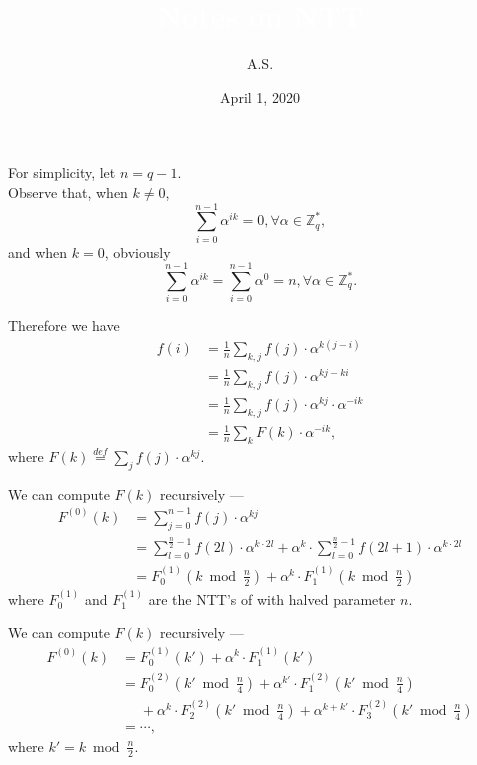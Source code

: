 \documentclass{beamer}	%
\title{\textcolor{white}{Notes on NTT}}
\subtitle{\textcolor{white}{}}
\author{A.S.}
\date{April 1, 2020}
\newcommand{\Z}{\mathbb{Z}}
\theoremstyle{plain}
\theoremstyle{definition}
\theoremstyle{remark}
\numberwithin{equation}{section}
\begin{document}
\begin{frame}
For simplicity, let $n = q - 1$.\\
Observe that, when $k \ne 0$, 
\[
\sum_{i=0}^{n-1}\alpha^{ik} = 0, \forall \alpha \in \Z_q^*,
\]
and when $k = 0$, obviously
\[
\sum_{i=0}^{n-1}\alpha^{ik} = \sum_{i=0}^{n-1}\alpha^0 = n, \forall \alpha \in \Z_q^*.
\]
\end{frame}

\begin{frame}
Therefore we have
\begin{align*}
f(i) & = \frac{1}{n}\sum_{k,j}{f(j) \cdot \alpha^{k(j-i)}} \\
     & = \frac{1}{n}\sum_{k,j}{f(j) \cdot \alpha^{kj-ki}} \\
     & = \frac{1}{n}\sum_{k,j}{f(j) \cdot \alpha^{kj} \cdot \alpha^{-ik}} \\
     & = \frac{1}{n}\sum_k{F(k) \cdot \alpha^{-ik}},
\end{align*}
where $F(k) \overset{def}{=} \sum_{j}{f(j) \cdot \alpha^{kj}}$.
\end{frame}

\begin{frame}
We can compute $F(k)$ recursively ---
\begin{align*}
F^{(0)}(k) &= \sum_{j=0}^{n-1}{f(j) \cdot \alpha^{kj}} \\
           &= \sum_{l=0}^{\frac{n}{2}-1}{f(2l) \cdot \alpha^{k \cdot 2l}} + \alpha^{k} \cdot \sum_{l=0}^{\frac{n}{2}-1}{f(2l+1) \cdot \alpha^{k \cdot 2l}} \\
           &= F^{(1)}_0(k \bmod \frac{n}{2}) + \alpha^{k} \cdot F^{(1)}_1(k \bmod \frac{n}{2})
\end{align*}
where $F^{(1)}_0$ and $F^{(1)}_1$ are the NTT's of with halved parameter $n$.

\end{frame}

\begin{frame}
We can compute $F(k)$ recursively ---
\begin{align*}
F^{(0)}(k) &= F^{(1)}_0(k') + \alpha^{k} \cdot F^{(1)}_1(k') \\
           &= F^{(2)}_0(k' \bmod \frac{n}{4}) + \alpha^{k'} \cdot F^{(2)}_1(k' \bmod \frac{n}{4})  \\
           &\phantom{=} + \alpha^{k} \cdot F^{(2)}_2(k' \bmod \frac{n}{4}) + \alpha^{k+k'} \cdot F^{(2)}_3(k' \bmod \frac{n}{4}) \\
           &= \cdots,
\end{align*}
where $k' = k \bmod \frac{n}{2}$.
\end{frame}
\end{document}
